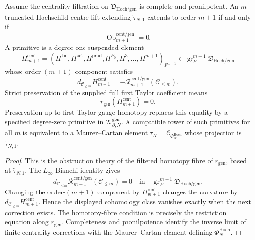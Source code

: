 \begin{prop}
\label{prop:relative-hochschild-centre-extension-criterion}
Assume the centrality filtration on
\(\mathfrak D_{\mathrm{Hoch}/\mathrm{gen}}\) is complete and
pronilpotent.  An \(m\)-truncated Hochschild-centre lift extending
\(\widetilde\tau_{N,1}\) extends to order \(m+1\) if and only if
\[
  \operatorname{Ob}^{\mathrm{cent}/\mathrm{gen}}_{m+1}=0 .
\]
A primitive is a degree-one suspended element
\[
  H^{\mathrm{cent}}_{m+1}
  =
  (H^{\mathrm{Lie}},H^{\mathrm{act}},H^{\mathrm{prod}},
   H^{P_0},H^3,\ldots,H^{m+1})_{F^{m+1}}
  \in
  \operatorname{gr}^{m+1}_{F}
  \mathfrak D_{\mathrm{Hoch}/\mathrm{gen}}
\]
whose order-\((m+1)\) component satisfies
\[
  d_{\mathcal C_{\le m}}H^{\mathrm{cent}}_{m+1}
  =
  -\mathcal R^{\mathrm{cent}/\mathrm{gen}}_{m+1}
  (\mathcal C_{\le m}).
\]
Strict preservation of the supplied full first Taylor coefficient means
\[
  r_{\mathrm{gen}}(H^{\mathrm{cent}}_{m+1})=0.
\]
Preservation up to first-Taylor gauge homotopy replaces this equality by a
specified degree-zero primitive in
\(\mathcal K^{\mathrm{gen}}_{\partial,N}\).  A compatible tower of such
primitives for all \(m\) is equivalent to a Maurer--Cartan element
\(\tau_N=\mathcal C_{\Phi_N^{\mathrm{Hoch}}}\) whose projection is
\(\widetilde\tau_{N,1}\).
\end{prop}

\begin{proof}
This is the obstruction theory of the filtered homotopy fibre of
\(r_{\mathrm{gen}}\), based at \(\widetilde\tau_{N,1}\).  The
\(L_\infty\) Bianchi identity gives
\[
  d_{\mathcal C_{\le m}}
  \mathcal R^{\mathrm{cent}/\mathrm{gen}}_{m+1}
  (\mathcal C_{\le m})=0
  \quad\text{in}\quad
  \operatorname{gr}^{m+1}_{F}
  \mathfrak D_{\mathrm{Hoch}/\mathrm{gen}} .
\]
Changing the order-\((m+1)\) component by
\(H^{\mathrm{cent}}_{m+1}\) changes the curvature by
\(d_{\mathcal C_{\le m}}H^{\mathrm{cent}}_{m+1}\).  Hence the displayed
cohomology class vanishes exactly when the next correction exists.  The
homotopy-fibre condition is precisely the restriction equation along
\(r_{\mathrm{gen}}\).  Completeness and pronilpotence identify the
inverse limit of finite centrality corrections with the Maurer--Cartan
element defining \(\Phi_N^{\mathrm{Hoch}}\).
\end{proof}

